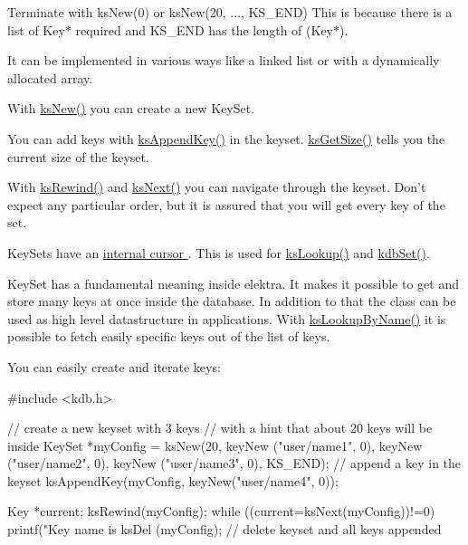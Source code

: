 Terminate with ksNew(0) or ksNew(20, ..., KS\_\-END) This is because there is a list of Key$\ast$ required and KS\_\-END has the length of (Key$\ast$).

It can be implemented in various ways like a linked list or with a dynamically allocated array.

With \hyperlink{group__keyset_ga671e1aaee3ae9dc13b4834a4ddbd2c3c}{ksNew()} you can create a new KeySet.

You can add keys with \hyperlink{group__keyset_gaa5a1d467a4d71041edce68ea7748ce45}{ksAppendKey()} in the keyset. \hyperlink{group__keyset_ga7474ad6b0a0fa969dbdf267ba5770eee}{ksGetSize()} tells you the current size of the keyset.

With \hyperlink{group__keyset_gabe793ff51f1728e3429c84a8a9086b70}{ksRewind()} and \hyperlink{group__keyset_ga317321c9065b5a4b3e33fe1c399bcec9}{ksNext()} you can navigate through the keyset. Don't expect any particular order, but it is assured that you will get every key of the set.

KeySets have an \hyperlink{group__keyset_ga4287b9416912c5f2ab9c195cb74fb094}{internal cursor }. This is used for \hyperlink{group__keyset_gaa34fc43a081e6b01e4120daa6c112004}{ksLookup()} and \hyperlink{group__kdb_ga11436b058408f83d303ca5e996832bcf}{kdbSet()}.

KeySet has a fundamental meaning inside elektra. It makes it possible to get and store many keys at once inside the database. In addition to that the class can be used as high level datastructure in applications. With \hyperlink{group__keyset_gad2e30fb6d4739d917c5abb2ac2f9c1a1}{ksLookupByName()} it is possible to fetch easily specific keys out of the list of keys.

You can easily create and iterate keys: 
\begin{DoxyCode}
#include <kdb.h>

// create a new keyset with 3 keys
// with a hint that about 20 keys will be inside
KeySet *myConfig = ksNew(20,
        keyNew ("user/name1", 0),
        keyNew ("user/name2", 0),
        keyNew ("user/name3", 0),
        KS_END);
// append a key in the keyset
ksAppendKey(myConfig, keyNew("user/name4", 0));

Key *current;
ksRewind(myConfig);
while ((current=ksNext(myConfig))!=0) {
        printf("Key name is %
}
ksDel (myConfig); // delete keyset and all keys appended
\end{DoxyCode}
 

